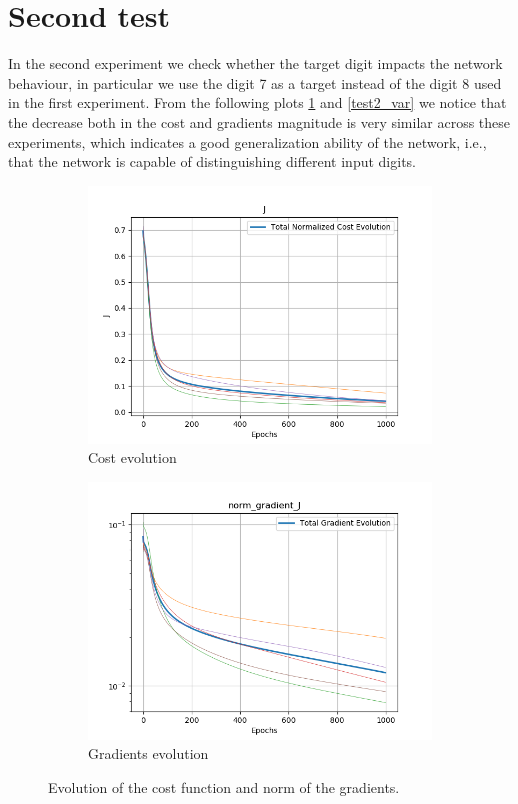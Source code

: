 \documentclass[a4paper,11pt,oneside]{book}
\begin{document}
\section{Second test}
In the second experiment we check whether the target digit impacts the network behaviour, in particular we use the digit 7 as a target instead of the digit 8 used in the first experiment. From the following plots \ref{test2_loss} and \ref{test2_var} we notice that the decrease both in the cost and gradients magnitude is very similar across these experiments, which indicates a good generalization ability of the network, i.e., that the network is capable of distinguishing different input digits.

\begin{figure}[h]
\centering
	\begin{subfigure}{0.49\textwidth}	
	\includegraphics[width=\textwidth]{figs/test2/J.png}
	\caption{Cost evolution}
	\end{subfigure}
\hfill
	\begin{subfigure}{0.49\textwidth}	
	\includegraphics[width=\textwidth]{figs/test2/norm_gradient_J.png}
	\caption{Gradients evolution}
	\end{subfigure}
 \caption{Evolution of the cost function and norm of the gradients.}
\label{test2_loss}
\end{figure}
\end{document}
